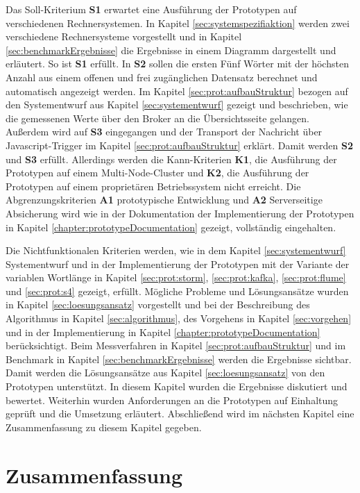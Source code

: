 Das Soll-Kriterium \textbf{S1} erwartet eine Ausführung der Prototypen auf verschiedenen Rechnersystemen. In Kapitel \ref{sec:systemspezifiaktion} werden zwei verschiedene Rechnersysteme vorgestellt und in Kapitel \ref{sec:benchmarkErgebnisse} die Ergebnisse in einem Diagramm dargestellt und erläutert. So ist \textbf{S1} erfüllt. In \textbf{S2} sollen die ersten Fünf Wörter mit der höchsten Anzahl aus einem offenen und frei zugänglichen Datensatz berechnet und automatisch angezeigt werden. Im Kapitel \ref{sec:prot:aufbauStruktur} bezogen auf den Systementwurf aus Kapitel \ref{sec:systementwurf} gezeigt und beschrieben, wie die gemessenen Werte über den Broker an die Übersichtsseite gelangen. Außerdem wird auf \textbf{S3} eingegangen und der Transport der Nachricht über Javascript-Trigger im Kapitel \ref{sec:prot:aufbauStruktur} erklärt. Damit werden \textbf{S2} und \textbf{S3} erfüllt. Allerdings werden die Kann-Kriterien \textbf{K1}, die Ausführung der Prototypen auf einem Multi-Node-Cluster und \textbf{K2}, die Ausführung der Prototypen auf einem proprietären Betriebssystem nicht erreicht. Die Abgrenzungskriterien \textbf{A1} prototypische Entwicklung und \textbf{A2} Serverseitige Absicherung wird wie in der Dokumentation der Implementierung der Prototypen in Kapitel \ref{chapter:prototypeDocumentation} gezeigt, vollständig eingehalten.

Die Nichtfunktionalen Kriterien werden, wie in dem Kapitel \ref{sec:systementwurf} Systementwurf und in der Implementierung der Prototypen mit der Variante der variablen Wortlänge in Kapitel \ref{sec:prot:storm}, \ref{sec:prot:kafka}, \ref{sec:prot:flume} und \ref{sec:prot:s4} gezeigt, erfüllt. Mögliche Probleme und Lösungsansätze wurden in Kapitel \ref{sec:loesungsansatz} vorgestellt und bei der Beschreibung des Algorithmus in Kapitel \ref{sec:algorithmus}, des Vorgehens in Kapitel \ref{sec:vorgehen} und in der Implementierung in Kapitel \ref{chapter:prototypeDocumentation} berücksichtigt. Beim Messverfahren in Kapitel \ref{sec:prot:aufbauStruktur} und im Benchmark in Kapitel \ref{sec:benchmarkErgebnisse} werden die Ergebnisse sichtbar. Damit werden die Lösungsansätze aus Kapitel \ref{sec:loesungsansatz} von den Prototypen unterstützt. In diesem Kapitel wurden die Ergebnisse diskutiert und bewertet. Weiterhin wurden Anforderungen an die Prototypen auf Einhaltung geprüft und die Umsetzung erläutert. Abschließend wird im nächsten Kapitel eine Zusammenfassung zu diesem Kapitel gegeben.


\section{Zusammenfassung}

